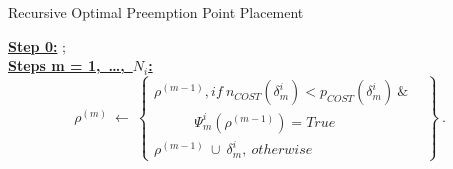 {\fontsize{10}{10}\selectfont
\begin{algorithm}
\caption{Recursive Optimal Preemption Point Placement}
\label{alg:recursive-optimal-ppp}
\begin{algorithmic}[0]
\small
\State \textbf{\underline{Step 0:}}
;
\\
\State \textbf{\underline{Steps m = 1,\ \ldots,\ $N_{i}$:}}
\begin{equation*}
\rho^{(m)}\ \gets\
\left\{
\begin{array}{l}
    \rho^{(m-1)}, if\ n_{COST}(\delta_{m}^{i}) < p_{COST}(\delta_{m}^{i})\ \&\ \ \ \ \\
    \ \ \ \ \ \ \ \ \ \ \ \ \ \Psi_{m}^{i}(\rho^{(m-1)}) = True\\
    \rho^{(m-1)}\ \cup\ \delta_{m}^{i},\ otherwise
\end{array}
\right\}~.
\end{equation*}
\normalsize
\end{algorithmic}
\end{algorithm}
}
